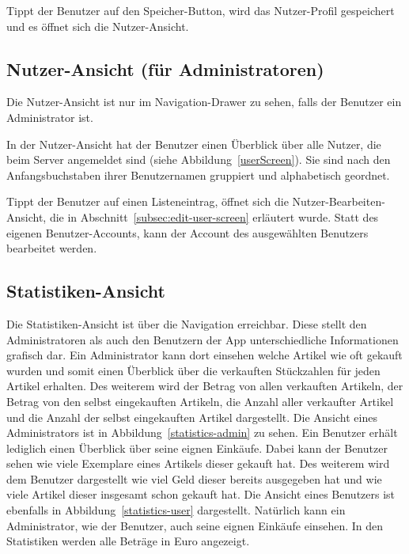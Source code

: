 Tippt der Benutzer auf den Speicher-Button, wird das Nutzer-Profil gespeichert und es öffnet sich die Nutzer-Ansicht.

\subsection{Nutzer-Ansicht (für Administratoren)} \label{subsec:user-screen}

Die Nutzer-Ansicht ist nur im Navigation-Drawer zu sehen, falls der Benutzer ein Administrator ist.

In der Nutzer-Ansicht hat der Benutzer einen Überblick über alle Nutzer, die beim Server angemeldet sind (siehe Abbildung~\ref{userScreen}).
Sie sind nach den Anfangsbuchstaben ihrer Benutzernamen gruppiert und alphabetisch geordnet.

Tippt der Benutzer auf einen Listeneintrag, öffnet sich die Nutzer-Bearbeiten-Ansicht, die in Abschnitt~\ref{subsec:edit-user-screen} erläutert wurde.
Statt des eigenen Benutzer-Accounts, kann der Account des ausgewählten Benutzers bearbeitet werden.

\subsection{Statistiken-Ansicht} \label{subsec:statistics-screen}

Die Statistiken-Ansicht ist über die Navigation erreichbar.
Diese stellt den Administratoren als auch den Benutzern der App unterschiedliche Informationen grafisch dar.
Ein Administrator kann dort einsehen welche Artikel wie oft gekauft wurden und somit einen Überblick über die verkauften Stückzahlen für jeden Artikel erhalten.
Des weiterem wird der Betrag von allen verkauften Artikeln, der Betrag von den selbst eingekauften Artikeln, die Anzahl aller verkaufter Artikel und die Anzahl der selbst eingekauften Artikel dargestellt.
Die Ansicht eines Administrators ist in Abbildung~\ref{statistics-admin} zu sehen.
Ein Benutzer erhält lediglich einen Überblick über seine eignen Einkäufe.
Dabei kann der Benutzer sehen wie viele Exemplare eines Artikels dieser gekauft hat.
Des weiterem wird dem Benutzer dargestellt wie viel Geld dieser bereits ausgegeben hat und wie viele Artikel dieser insgesamt schon gekauft hat.
Die Ansicht eines Benutzers ist ebenfalls in Abbildung~\ref{statistics-user} dargestellt.
Natürlich kann ein Administrator, wie der Benutzer, auch seine eignen Einkäufe einsehen.
In den Statistiken werden alle Beträge in Euro angezeigt.

